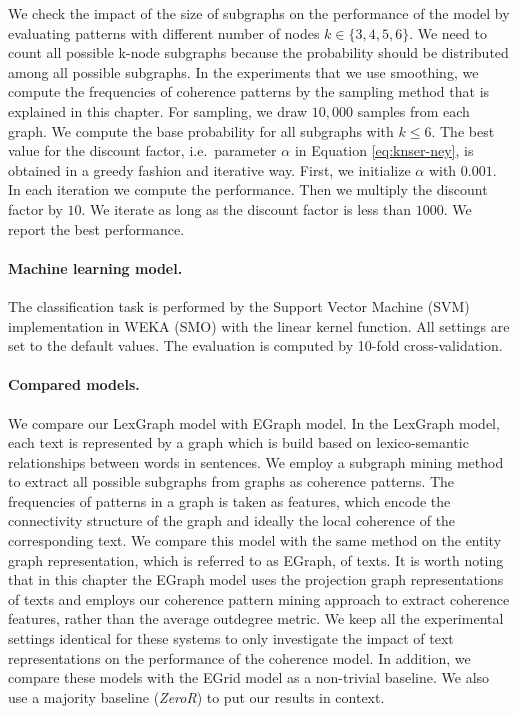 We check the impact of the size of subgraphs on the performance of the model by evaluating patterns with different number of nodes $k \in \lbrace3,4,5,6\rbrace$. 
We need to count all possible k-node subgraphs because the probability should be distributed among all possible subgraphs.  
In the experiments that we use smoothing, we compute the frequencies of coherence patterns by the sampling method that is explained in this chapter.  
For sampling, we draw $10,000$ samples from each graph. 
We compute the base probability for all subgraphs with $k \leq 6$.  
The best value for the discount factor, i.e.\ parameter $\alpha$ in Equation \ref{eq:knser-ney}, is obtained in a greedy fashion and iterative way.   
First, we initialize $\alpha$ with $0.001$. 
In each iteration we compute the performance. 
Then we multiply the discount factor by $10$. 
We iterate as long as the discount factor is less than $1000$. 
We report the best performance.
 
\paragraph{Machine learning model.}
The classification task is performed by the Support Vector Machine (SVM) implementation in WEKA (SMO) with the linear kernel function.  
All settings are set to the default values. 
The evaluation is computed by \mbox{10-fold} \mbox{cross-validation}. 

\paragraph{Compared models.}
We compare our LexGraph model with EGraph model.
In the LexGraph model, each text is represented by a graph which is build based on lexico-semantic relationships between words in sentences.  
We employ a subgraph mining method to extract all possible subgraphs from graphs as coherence patterns. 
The frequencies of patterns in a graph is taken as features, which encode the connectivity structure of the graph and ideally the local coherence of the corresponding text. 
We compare this model with the same method on the entity graph representation, which is referred to as EGraph, of texts. 
It is worth noting that in this chapter the EGraph model uses the projection graph representations of texts and employs our coherence pattern mining approach to extract coherence features, rather than the average outdegree metric. 
We keep all the experimental settings identical for these systems to only investigate the impact of  text representations on the performance of the coherence model. 
In addition, we compare these models with the EGrid model \cite{barzilay08} as a non-trivial baseline. 
We also use a majority baseline (\emph{ZeroR}) to put our results in context. 


